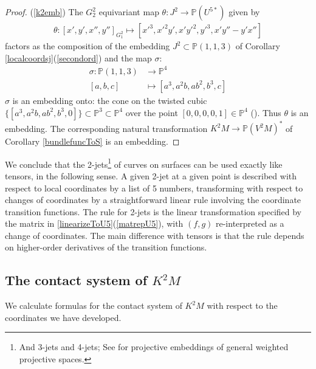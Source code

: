 \documentclass[12pt]{article}
\numberwithin{equation}{section}
\theoremstyle{plain}
\theoremstyle{definition}
\renewcommand{\P}{\mathbb{P}}
\newcommand{\ra}{\rightarrow}
\begin{document}
\begin{proof}
(\ref{k2emb}) The $G^{2}_{2}$ equivariant map $\theta:J^{2}\ra \P(U^{5*})$ given by
\begin{align*}
\theta:[x',y',x'',y'']_{G^{2}_{1}}\mapsto [x'^{3},x'^{2}y',x'y'^{2},y'^{3},x'y''-y'x'']
\end{align*}
factors as the composition of the embedding $J^{2}\subset \P(1,1,3)$ of Corollary \ref{localcoordsj}(\ref{secondord}) and the map $\sigma$:
\begin{align*}
\sigma:\P(1,1,3)&\ra \P^{4}\\
[a,b,c]&\mapsto[a^{3},a^{2}b,ab^{2},b^{3},c]
\end{align*}
$\sigma$ is an embedding onto: the cone on the twisted cubic $\{[a^{3},a^{2}b,ab^{2},b^{3},0]\}\subset \P^{3}\subset \P^{4}$ over the point $[0,0,0,0,1]\in \P^{4}$ (\cite{dolgachevWeighted}). Thus $\theta$ is an embedding. The corresponding natural transformation $K^{2}M\ra \P(V^{2}M)^{*}$ of Corollary \ref{bundlefuncToS} is an embedding.
\end{proof}

We conclude that the 2-jets\footnote{And 3-jets and 4-jets; See \cite{dolgachev} for projective embeddings of general weighted projective spaces.} of curves on surfaces can be used exactly like tensors, in the following sense. A given 2-jet at a given point is described with respect to local coordinates by a list of 5 numbers, transforming with respect to changes of coordinates by a straightforward linear rule involving the coordinate transition functions. The rule for 2-jets is the linear transformation specified by the matrix in \ref{linearizeToU5}(\ref{matrepU5}), with $(f,g)$ re-interpreted as a change of coordinates. The main difference with tensors is that the rule depends on higher-order derivatives of the transition functions.

\subsection{The contact system of $K^{2}M$}\label{contactsystemForms}
We calculate formulas for the contact system of $K^{2}M$ with respect to the coordinates we have developed.
\end{document}

